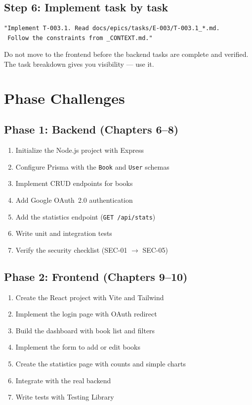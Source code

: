 \subsection{Step 6: Implement task by task}
\begin{lstlisting}[language={}]
"Implement T-003.1. Read docs/epics/tasks/E-003/T-003.1_*.md.
 Follow the constraints from _CONTEXT.md."
\end{lstlisting}

\begin{tipbox}
Do not move to the frontend before the backend tasks are complete and verified. The task breakdown gives you visibility --- use it.
\end{tipbox}

\section{Phase Challenges}

\subsection{Phase 1: Backend (Chapters 6--8)}
\begin{enumerate}
  \item Initialize the Node.js project with Express
  \item Configure Prisma with the \texttt{Book} and \texttt{User} schemas
  \item Implement CRUD endpoints for books
  \item Add Google OAuth~2.0 authentication
  \item Add the statistics endpoint (\texttt{GET /api/stats})
  \item Write unit and integration tests
  \item Verify the security checklist (SEC-01 $\rightarrow$ SEC-05)
\end{enumerate}

\subsection{Phase 2: Frontend (Chapters 9--10)}
\begin{enumerate}
  \item Create the React project with Vite and Tailwind
  \item Implement the login page with OAuth redirect
  \item Build the dashboard with book list and filters
  \item Implement the form to add or edit books
  \item Create the statistics page with counts and simple charts
  \item Integrate with the real backend
  \item Write tests with Testing Library
\end{enumerate}

